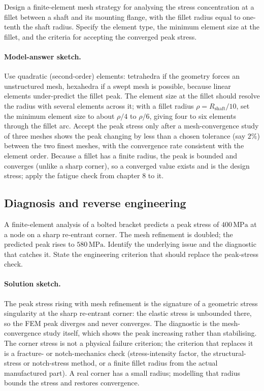 \begin{exercise}
Design a finite-element mesh strategy for analysing the stress
concentration at a fillet between a shaft and its mounting
flange, with the fillet radius equal to one-tenth the shaft
radius. Specify the element type, the minimum element size at
the fillet, and the criteria for accepting the converged peak
stress.

\paragraph{Model-answer sketch.} Use quadratic (second-order)
elements: tetrahedra if the geometry forces an unstructured mesh,
hexahedra if a swept mesh is possible, because linear elements
under-predict the fillet peak. The element size at the fillet should
resolve the radius with several elements across it; with a fillet
radius $\rho = R_{\text{shaft}}/10$, set the minimum element size to
about $\rho/4$ to $\rho/6$, giving four to six elements through the
fillet arc. Accept the peak stress only after a mesh-convergence study
of three meshes shows the peak changing by less than a chosen tolerance
(say $2\%$) between the two finest meshes, with the convergence rate
consistent with the element order. Because a fillet has a finite
radius, the peak is bounded and converges (unlike a sharp corner), so
a converged value exists and is the design stress; apply the fatigue
check from chapter 8 to it.
\end{exercise}

\subsection*{Diagnosis and reverse engineering}

\begin{exercise}
A finite-element analysis of a bolted bracket predicts a peak
stress of $400\,\text{MPa}$ at a node on a sharp re-entrant
corner. The mesh refinement is doubled; the predicted peak rises
to $580\,\text{MPa}$. Identify the underlying issue and the
diagnostic that catches it. State the engineering criterion that
should replace the peak-stress check.

\paragraph{Solution sketch.} The peak stress rising with mesh
refinement is the signature of a geometric stress singularity at the
sharp re-entrant corner: the elastic stress is unbounded there, so the
FEM peak diverges and never converges. The diagnostic is the
mesh-convergence study itself, which shows the peak increasing rather
than stabilising. The corner stress is not a physical failure
criterion; the criterion that replaces it is a fracture- or
notch-mechanics check (stress-intensity factor, the structural-stress
or notch-stress method, or a finite fillet radius from the actual
manufactured part). A real corner has a small radius; modelling that
radius bounds the stress and restores convergence.
\end{exercise}

